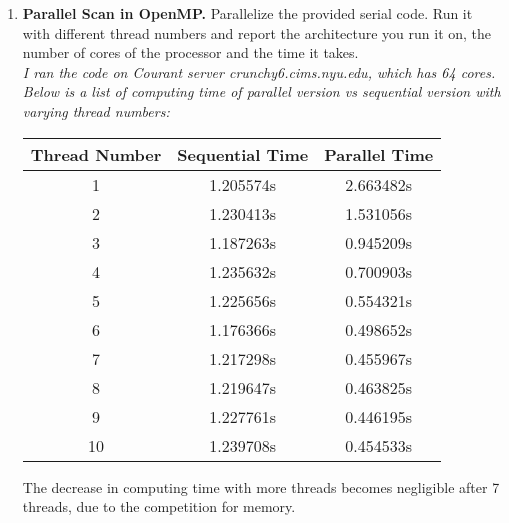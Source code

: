 \documentclass{article}
\begin{document}
\begin{enumerate}
\item \textbf{ Parallel Scan in OpenMP. } Parallelize the provided serial code. Run it with different thread numbers and report the
architecture you run it on, the number of cores of the processor and the time it takes.
\\\textit{I ran the code on Courant server crunchy6.cims.nyu.edu, which has 64 cores. Below is a list of computing time of parallel version vs sequential version with varying thread numbers:}
\begin{center}
\begin{tabular}{||c c c||} 
 \hline
 Thread Number & Sequential Time & Parallel Time\\ [0.5ex] 
 \hline\hline
 1 &  1.205574s & 2.663482s \\ 
 \hline
 2 & 1.230413s  & 1.531056s \\
 \hline
 3 & 1.187263s  &  0.945209s \\
 \hline
 4 &  1.235632s &  0.700903s \\
 \hline
 5 & 1.225656s & 0.554321s \\ 
 \hline
 6 & 1.176366s & 0.498652s \\ 
\hline
 7 & 1.217298s & 0.455967s \\ 
 \hline
  8 & 1.219647s  & 0.463825s \\
 \hline
 9 & 1.227761s  & 0.446195s \\ 
  \hline
10 & 1.239708s  & 0.454533s \\  [1ex] 
  \hline
\end{tabular}
\end{center}
The decrease in computing time with more threads becomes negligible after 7 threads, due to the competition for memory.


\end{enumerate}
\end{document}
